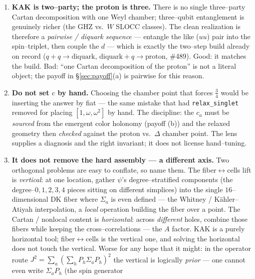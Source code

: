 \documentclass[11pt,oneside]{article}
\newcommand{\code}[1]{\texttt{#1}}
\theoremstyle{plain}
\begin{document}
\begin{enumerate}[leftmargin=2em]
  \item \textbf{KAK is two--party; the proton is three.} There is no single
        three--party Cartan decomposition with one Weyl chamber; three--qubit
        entanglement is genuinely richer (the $\mathrm{GHZ}$ vs.\ $W$ SLOCC
        classes). The clean realization is therefore a \emph{pairwise / diquark
        sequence} --- entangle the like ($uu$) pair into the spin--triplet, then
        couple the $d$ --- which is exactly the two--step build already on record
        ($q\!+\!q\to\text{diquark}$, $\text{diquark}\!+\!q\to\text{proton}$, \#489).
        Good: it matches the build. Bad: ``one Cartan decomposition of the proton''
        is not a literal object; the payoff in \S\ref{sec:payoff}(a) is pairwise
        for this reason.
  \item \textbf{Do not set $c$ by hand.} Choosing the chamber point that forces
        $\tfrac34$ would be inserting the answer by fiat --- the same mistake that
        had \code{relax\_singlet} removed for placing $[1,\omega,\omega^2]$ by
        hand. The discipline: the $c_a$ must be \emph{sourced} from the emergent
        color holonomy (payoff (b)) and the relaxed geometry then \emph{checked}
        against the proton vs.\ $\Delta$ chamber point. The lens supplies a
        diagnosis and the right invariant; it does not license hand--tuning.
  \item \textbf{It does not remove the hard assembly --- a different axis.}
        Two orthogonal problems are easy to conflate, so name them. The
        fiber$\leftrightarrow$cells lift is \emph{vertical}: at one location,
        gather $\psi$'s degree--stratified components (the degree--$0,1,2,3,4$
        pieces sitting on different simplices) into the single $16$--dimensional DK
        fiber where $\Sigma_a$ is even defined --- the Whitney / K\"ahler--Atiyah
        interpolation, a \emph{local} operation building the fiber over a point.
        The Cartan / nonlocal content is \emph{horizontal}: across \emph{different}
        holes, combine those fibers while keeping the cross--correlations --- the
        $A$ factor. KAK is a purely horizontal tool; fiber$\leftrightarrow$cells is
        the vertical one, and solving the horizontal does not touch the vertical.
        Worse for any hope that it might: in the operator route
        $J^2=\sum_a(\sum_h P_h\Sigma_a P_h)^2$ the vertical is logically
        \emph{prior} --- one cannot even write $\Sigma_a P_h$ (the spin generator

\end{enumerate}
\end{document}
